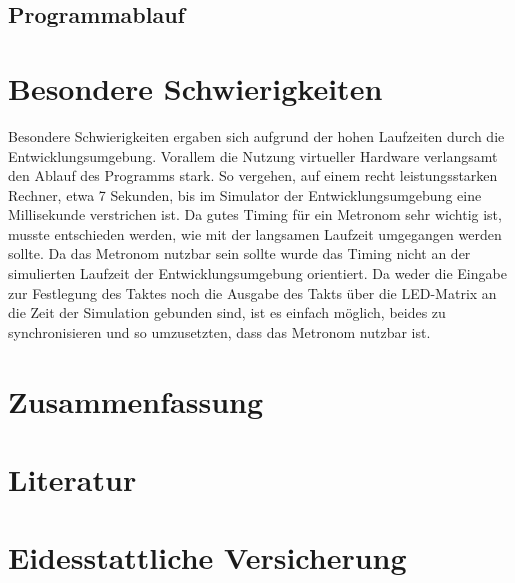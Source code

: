 \documentclass[a4paper, 12pt]{scrartcl}
\begin{document}
\subsection{Programmablauf}



\section{Besondere Schwierigkeiten}
Besondere Schwierigkeiten ergaben sich aufgrund der hohen Laufzeiten durch die Entwicklungsumgebung. Vorallem die Nutzung virtueller Hardware verlangsamt den Ablauf des Programms stark. So vergehen, auf einem recht leistungsstarken Rechner, etwa 7 Sekunden, bis im Simulator der Entwicklungsumgebung eine Millisekunde verstrichen ist. Da gutes Timing für ein Metronom sehr wichtig ist, musste entschieden werden, wie mit der langsamen Laufzeit umgegangen werden sollte. Da das Metronom nutzbar sein sollte wurde das Timing nicht an der simulierten Laufzeit der Entwicklungsumgebung orientiert. Da weder die Eingabe zur Festlegung des Taktes noch die Ausgabe des Takts über die LED-Matrix an die Zeit der Simulation gebunden sind, ist es einfach möglich, beides zu synchronisieren und so umzusetzten, dass das Metronom nutzbar ist.
\\

\section{Zusammenfassung}

\section{Literatur}
\section{Eidesstattliche Versicherung}
\end{document}
